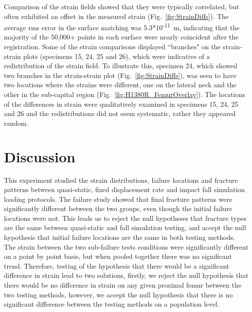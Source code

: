 Comparison of the strain fields showed that they were typically correlated, but often exhibited an offset in the measured strain (Fig.~\ref{fig:StrainDiffs}).
The average \acs{rms} error in the surface matching was 5.3*10\textsuperscript{-11}~\ac{m}, indicating that the majority of the 50,000+ points in each surface were nearly coincident after the registration.
Some of the strain comparisons displayed ``branches" on the strain-strain plots (specimens 15, 24, 25 and 26), which were indicative of a redistribution of the strain field.
To illustrate this, specimen 24, which showed two branches in the strain-strain plot (Fig.~\ref{fig:StrainDiffs}), was seen to have two locations where the strains were different, one on the lateral neck and the other in the sub-capital region (Fig.~\ref{fig:H1380R_FemurOverlay}).
The locations of the differences in strain were qualitatively examined in specimens 15, 24, 25 and 26 and the redistributions did not seem systematic, rather they appeared random.

\section{Discussion}
This experiment studied the strain distributions, failure locations and fracture patterns between quasi-static, fixed displacement rate and impact fall simulation loading protocols.
The failure study showed that final fracture patterns were significantly different between the two groups, even though the initial failure locations were not.
This leads us to reject the null hypotheses that fracture types are the same between quasi-static and fall simulation testing, and accept the null hypothesis that initial failure locations are the same in both testing methods.
The strain between the two sub-failure tests conditions were significantly different on a point by point basis, but when pooled together there was no significant trend.
Therefore, testing of the hypothesis that there would be a significant difference in strain lead to two solutions, firstly, we reject the null hypothesis that there would be no difference in strain on any given proximal femur between the two testing methods, however, we accept the null hypothesis that there is no significant difference between the testing methods on a population level.

